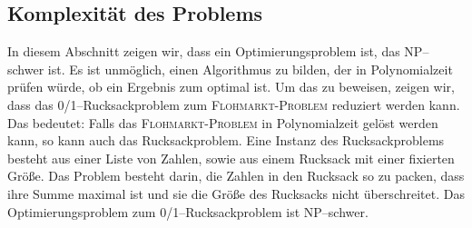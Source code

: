 \subsection{Komplexität des Problems}\label{sec:komplexitaet}





In diesem Abschnitt zeigen wir, dass \fp{} ein Optimierungsproblem ist, das NP--schwer ist.
Es ist unmöglich, einen Algorithmus zu bilden, der in Polynomialzeit prüfen würde,
ob ein Ergebnis zum \fp{} optimal ist. 
Um das zu beweisen, zeigen wir, dass das
0/1--Rucksackproblem zum \textsc{Floh\-markt-\-Pro\-blem} reduziert werden kann.
Das bedeutet: Falls das \textsc{Floh\-markt-\-Pro\-blem} in Polynomialzeit gelöst werden kann,
so kann auch das Rucksackproblem.
Eine Instanz des Rucksackproblems besteht aus einer Liste von Zahlen,
sowie aus einem Rucksack mit einer fixierten Größe.
Das Problem besteht darin, die Zahlen in den Rucksack 
so zu packen, dass ihre Summe maximal ist und sie die Größe des Rucksacks nicht überschreitet.
Das Optimierungsproblem zum 0/1--Rucksackproblem ist NP--schwer.\cite{garey_johnson_2009}


